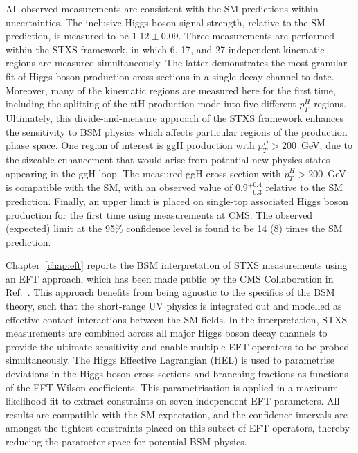All observed measurements are consistent with the SM predictions within uncertainties. The inclusive Higgs boson signal strength, relative to the SM prediction, is measured to be $1.12 \pm 0.09$. Three measurements are performed within the STXS framework, in which 6, 17, and 27 independent kinematic regions are measured simultaneously. The latter demonstrates the most granular fit of Higgs boson production cross sections in a single decay channel to-date. Moreover, many of the kinematic regions are measured here for the first time, including the splitting of the ttH production mode into five different $p_T^H$ regions. Ultimately, this divide-and-measure approach of the STXS framework enhances the sensitivity to BSM physics which affects particular regions of the production phase space. One region of interest is ggH production with $p_T^H>200$~GeV, due to the sizeable enhancement that would arise from potential new physics states appearing in the ggH loop. The measured ggH cross section with $p_T^H>200$~GeV is compatible with the SM, with an observed value of $0.9^{+0.4}_{-0.3}$ relative to the SM prediction. Finally, an upper limit is placed on single-top associated Higgs boson production for the first time using \Hgg measurements at CMS. The observed (expected) limit at the 95\% confidence level is found to be 14 (8) times the SM prediction.

Chapter~\ref{chap:eft} reports the BSM interpretation of STXS measurements using an EFT approach, which has been made public by the CMS Collaboration in Ref.~\cite{CMS-PAS-HIG-19-005}. This approach benefits from being agnostic to the specifics of the BSM theory, such that the short-range UV physics is integrated out and modelled as effective contact interactions between the SM fields. In the interpretation, STXS measurements are combined across all major Higgs boson decay channels to provide the ultimate sensitivity and enable multiple EFT operators to be probed simultaneously. The Higgs Effective Lagrangian (HEL) is used to parametrise deviations in the Higgs boson cross sections and branching fractions as functions of the EFT Wilson coefficients. This parametrisation is applied in a maximum likelihood fit to extract constraints on seven independent EFT parameters. All results are compatible with the SM expectation, and the confidence intervals are amongst the tightest constraints placed on this subset of EFT operators, thereby reducing the parameter space for potential BSM physics.

